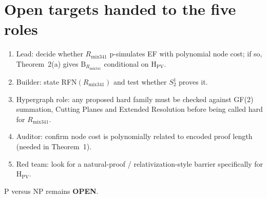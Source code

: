 \documentclass[11pt]{article}
\begin{document}
\section*{Open targets handed to the five roles}
\begin{enumerate}
\item Lead: decide whether $R_{\mathrm{mix341}}$ p-simulates EF with polynomial node cost; if so,
 Theorem~2(a) gives $\mathrm B_{R_{\mathrm{mix341}}}$ conditional on H$_{\mathrm{PV}}$.
\item Builder: state RFN$(R_{\mathrm{mix341}})$ and test whether $S^1_2$ proves it.
\item Hypergraph role: any proposed hard family must be checked against GF(2) summation,
 Cutting Planes and Extended Resolution before being called hard for $R_{\mathrm{mix341}}$.
\item Auditor: confirm node cost is polynomially related to encoded proof length (needed in
 Theorem~1).
\item Red team: look for a natural-proof / relativization-style barrier specifically for H$_{\mathrm{PV}}$.
\end{enumerate}
P versus NP remains \textbf{OPEN}.
\end{document}
